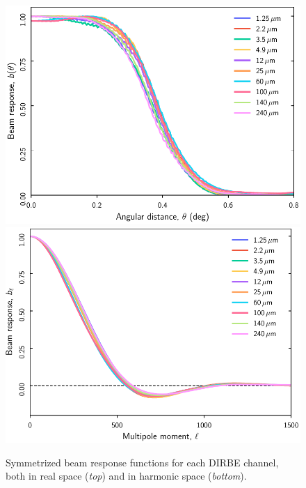 \documentclass{aa}
\begin{document}
\begin{figure}
  \centering
  \includegraphics[width=\linewidth]{figs/DIRBE_beam_theta.pdf}\\
  \includegraphics[width=\linewidth]{figs/DIRBE_beam_ell.pdf}
  \caption{Symmetrized beam response functions for each DIRBE channel, both in real space (\emph{top}) and in harmonic space (\emph{bottom}).}
  \label{fig:beams}
\end{figure}
\end{document}
